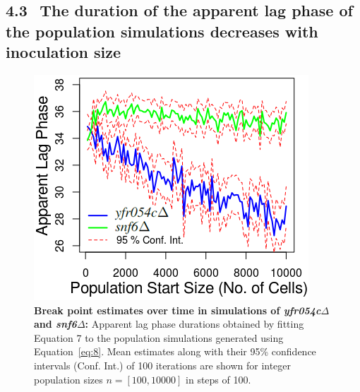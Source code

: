 \documentclass{bioinfo}
\begin{document}
\vspace{-0.5em}
\subsection*{4.3 $\>\>$The duration of the apparent lag phase of the population simulations decreases with inoculation size}

\begin{figure}[H]
\vspace{-2em}
\centering
\includegraphics[width=0.7\linewidth]{Ch1ApparentLags.png}
\vspace{-1em}
\caption{\footnotesize{\textbf{Break point estimates over time in simulations of \textit{yfr054c}$\Delta$ and \textit{snf6}$\Delta$:} Apparent lag phase durations obtained by fitting Equation 7 to the population simulations generated using Equation~\ref{eq:8}. Mean estimates along with their 95\% confidence intervals (Conf. Int.) of 100 iterations are shown for integer population sizes $n=[100,10000]$ in steps of 100.}}
\label{fig:ApparentLags}
\vspace{-3em}
\end{figure}
\end{document}
